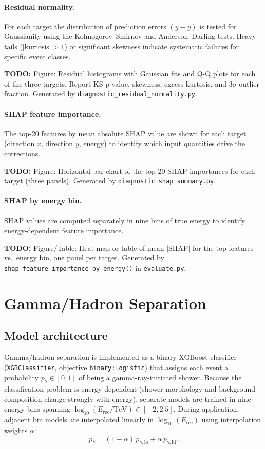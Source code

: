 \documentclass[12pt]{article}
\newcommand{\todo}[1]{\begin{hintBox} \textbf{TODO:} #1 \end{hintBox}}
\begin{document}
\paragraph{Residual normality.}
For each target the distribution of prediction errors $(y - \hat{y})$ is tested
for Gaussianity using the Kolmogorov--Smirnov and Anderson--Darling tests.
Heavy tails ($|$kurtosis$| > 1$) or significant skewness indicate systematic failures
for specific event classes.
\todo{Figure: Residual histograms with Gaussian fits and Q-Q plots for each of the three targets. Report KS p-value, skewness, excess kurtosis, and 3$\sigma$ outlier fraction. Generated by \texttt{diagnostic\_residual\_normality.py}.}

\paragraph{SHAP feature importance.}
The top-20 features by mean absolute SHAP value are shown for each target
(direction $x$, direction $y$, energy) to identify which input quantities
drive the corrections.
\todo{Figure: Horizontal bar chart of the top-20 SHAP importances for each target (three panels). Generated by \texttt{diagnostic\_shap\_summary.py}.}

\paragraph{SHAP by energy bin.}
SHAP values are computed separately in nine bins of true energy to
identify energy-dependent feature importance.
\todo{Figure/Table: Heat map or table of mean $|$SHAP$|$ for the top features vs.\ energy bin, one panel per target. Generated by \texttt{shap\_feature\_importance\_by\_energy()} in \texttt{evaluate.py}.}



\section{Gamma/Hadron Separation}
\label{sec:classification}

\subsection{Model architecture}

Gamma/hadron separation is implemented as a binary XGBoost classifier
(\texttt{XGBClassifier}, objective \texttt{binary:logistic})
that assigns each event a probability $p_\gamma \in [0,1]$ of being
a gamma-ray-initiated shower.
Because the classification problem is energy-dependent (shower morphology and
background composition change strongly with energy), separate models are trained
in nine energy bins spanning $\log_{10}(E_\mathrm{rec}/\mathrm{TeV}) \in [-2, 2.5]$.
During application, adjacent bin models are interpolated linearly in
$\log_{10}(E_\mathrm{rec})$ using interpolation weights $\alpha$:
\begin{equation}
  p_\gamma = (1 - \alpha)\, p_{\gamma,\mathrm{lo}} + \alpha\, p_{\gamma,\mathrm{hi}}.
\end{equation}
\end{document}
